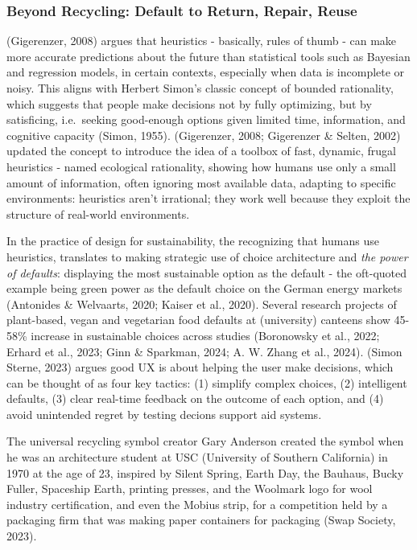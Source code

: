 \documentclass[
  12pt,
  letterpaper,
  DIV=11,
  numbers=noendperiod]{scrartcl}
\begin{document}
\subsubsection{Beyond Recycling: Default to Return, Repair,
Reuse}\label{beyond-recycling-default-to-return-repair-reuse}

(Gigerenzer, 2008) argues that heuristics - basically, rules of thumb -
can make more accurate predictions about the future than statistical
tools such as Bayesian and regression models, in certain contexts,
especially when data is incomplete or noisy. This aligns with Herbert
Simon's classic concept of bounded rationality, which suggests that
people make decisions not by fully optimizing, but by satisficing,
i.e.~seeking good-enough options given limited time, information, and
cognitive capacity (Simon, 1955). (Gigerenzer, 2008; Gigerenzer \&
Selten, 2002) updated the concept to introduce the idea of a toolbox of
fast, dynamic, frugal heuristics - named ecological rationality, showing
how humans use only a small amount of information, often ignoring most
available data, adapting to specific environments: heuristics aren't
irrational; they work well because they exploit the structure of
real-world environments.

In the practice of design for sustainability, the recognizing that
humans use heuristics, translates to making strategic use of choice
architecture and \emph{the power of defaults}: displaying the most
sustainable option as the default - the oft-quoted example being green
power as the default choice on the German energy markets (Antonides \&
Welvaarts, 2020; Kaiser et al., 2020). Several research projects of
plant-based, vegan and vegetarian food defaults at (university) canteens
show 45-58\% increase in sustainable choices across studies (Boronowsky
et al., 2022; Erhard et al., 2023; Ginn \& Sparkman, 2024; A. W. Zhang
et al., 2024). (Simon Sterne, 2023) argues good UX is about helping the
user make decisions, which can be thought of as four key tactics: (1)
simplify complex choices, (2) intelligent defaults, (3) clear real-time
feedback on the outcome of each option, and (4) avoid unintended regret
by testing decions support aid systems.

The universal recycling symbol creator Gary Anderson created the symbol
when he was an architecture student at USC (University of Southern
California) in 1970 at the age of 23, inspired by Silent Spring, Earth
Day, the Bauhaus, Bucky Fuller, Spaceship Earth, printing presses, and
the Woolmark logo for wool industry certification, and even the Mobius
strip, for a competition held by a packaging firm that was making paper
containers for packaging (Swap Society, 2023).
\end{document}
